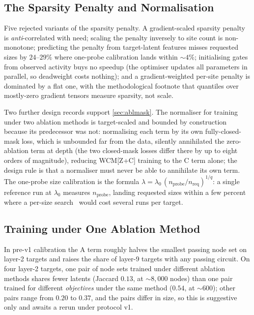 \documentclass[10pt]{article}
\begin{document}
\subsection{The Sparsity Penalty and Normalisation}
Five rejected variants of the sparsity penalty.
A gradient-scaled sparsity penalty is \emph{anti}-correlated with need; scaling the penalty inversely to site count is non-monotone; predicting the penalty from target-latent features misses requested sizes by $24$--$29\%$ where one-probe calibration lands within ${\sim}4\%$; initialising gates from observed activity buys no speedup (the optimiser updates all parameters in parallel, so deadweight costs nothing); and a gradient-weighted per-site penalty is dominated by a flat one, with the methodological footnote that quantiles over mostly-zero gradient tensors measure sparsity, not scale.

Two further design records support \cref{sec:ablmask}.
The normaliser for training under two ablation methods is target-scaled and bounded by construction because its predecessor was not: normalising each term by its own fully-closed-mask loss, which is unbounded far from the data, silently annihilated the zero-ablation term at depth (the two closed-mask losses differ there by up to eight orders of magnitude), reducing WCM[Z+C] training to the C term alone; the design rule is that a normaliser must never be able to annihilate its own term.
The one-probe size calibration is the formula $\lambda = \lambda_0 \, (n_{\mathrm{probe}} / n_{\mathrm{req}})^{1/q}$: a single reference run at $\lambda_0$ measures $n_{\mathrm{probe}}$, landing requested sizes within a few percent where a per-size search~\citep[cf.\ the sparsity-targeting of][]{bhaskar2024finding} would cost several runs per target.

\subsection{Training under One Ablation Method}
\label{app:single-method}
In pre-v1 calibration the A term roughly halves the smallest passing node set on layer-2 targets and raises the share of layer-9 targets with any passing circuit.
On four layer-2 targets, one pair of node sets trained under different ablation methods shares fewer latents (Jaccard $0.13$, at ${\sim}8{,}000$ nodes) than one pair trained for different \emph{objectives} under the same method ($0.54$, at ${\sim}600$); other pairs range from $0.20$ to $0.37$, and the pairs differ in size, so this is suggestive only and awaits a rerun under protocol v1.
\end{document}
